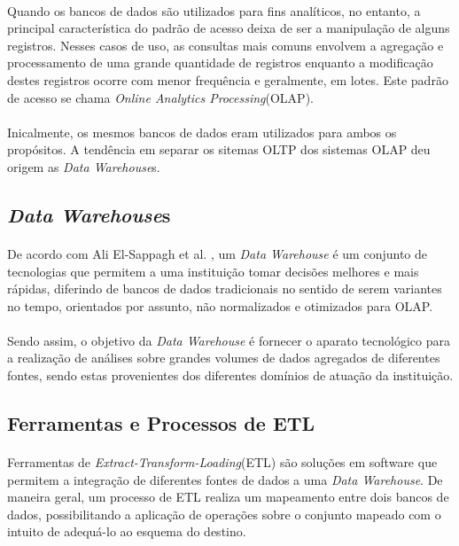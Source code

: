 \paragraph{} Quando os bancos de dados são utilizados para fins analíticos, no entanto, a principal característica do padrão de acesso deixa de ser a manipulação
de alguns registros. Nesses casos de uso, as consultas mais comuns envolvem a agregação e processamento de uma grande quantidade de registros enquanto a 
modificação destes registros ocorre com menor frequência e geralmente, em lotes. Este padrão de acesso se chama \textit{Online Analytics Processing}(OLAP).

\paragraph{} Inicalmente, os mesmos bancos de dados eram utilizados para ambos os propósitos. A tendência em separar os sitemas OLTP dos sistemas OLAP deu origem as \textit{Data Warehouse}s.\cite{kleppmann2017designing}

\subsection{\textit{Data Warehouse}s}

\paragraph{} De acordo com Ali El-Sappagh et al. \cite{el2011proposed}, um \textit{Data Warehouse} é um conjunto de tecnologias que permitem a uma instituição tomar decisões melhores e mais rápidas, diferindo de bancos de dados tradicionais no sentido de serem variantes no tempo, orientados por assunto, não normalizados e otimizados para OLAP.

\paragraph{} Sendo assim, o objetivo da \textit{Data Warehouse} é fornecer o aparato tecnológico para a realização de análises sobre grandes volumes de dados agregados de diferentes fontes, sendo estas provenientes dos diferentes domínios de atuação da instituição.

\subsection{Ferramentas e Processos de ETL} 

\paragraph{} Ferramentas de \textit{Extract-Transform-Loading}(ETL) são soluções em software que permitem a integração de diferentes fontes de dados a uma \textit{Data Warehouse}.
De maneira geral, um processo de ETL realiza um mapeamento entre dois bancos de dados, possibilitando a aplicação de operações sobre o conjunto mapeado com o intuito de adequá-lo ao esquema do destino.

